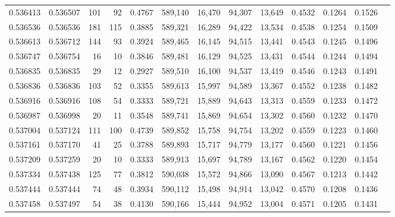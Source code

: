 \begin{tabular}{rrrrrrrrrrrrr}
0.536413 & 0.536507 &   101 &    92 &                                     0.4767 & 589,140 &  16,470 &  94,307 &  13,649 & 0.4532 & 0.1264 & 0.1526 \\
0.536536 & 0.536536 &   181 &   115 &                                     0.3885 & 589,321 &  16,289 &  94,422 &  13,534 & 0.4538 & 0.1254 & 0.1509 \\
0.536613 & 0.536712 &   144 &    93 &                                     0.3924 & 589,465 &  16,145 &  94,515 &  13,441 & 0.4543 & 0.1245 & 0.1496 \\
0.536747 & 0.536754 &    16 &    10 &                                     0.3846 & 589,481 &  16,129 &  94,525 &  13,431 & 0.4544 & 0.1244 & 0.1494 \\
0.536835 & 0.536835 &    29 &    12 &                                     0.2927 & 589,510 &  16,100 &  94,537 &  13,419 & 0.4546 & 0.1243 & 0.1491 \\
0.536836 & 0.536836 &   103 &    52 &                                     0.3355 & 589,613 &  15,997 &  94,589 &  13,367 & 0.4552 & 0.1238 & 0.1482 \\
0.536916 & 0.536916 &   108 &    54 &                                     0.3333 & 589,721 &  15,889 &  94,643 &  13,313 & 0.4559 & 0.1233 & 0.1472 \\
0.536987 & 0.536998 &    20 &    11 &                                     0.3548 & 589,741 &  15,869 &  94,654 &  13,302 & 0.4560 & 0.1232 & 0.1470 \\
0.537004 & 0.537124 &   111 &   100 &                                     0.4739 & 589,852 &  15,758 &  94,754 &  13,202 & 0.4559 & 0.1223 & 0.1460 \\
0.537161 & 0.537170 &    41 &    25 &                                     0.3788 & 589,893 &  15,717 &  94,779 &  13,177 & 0.4560 & 0.1221 & 0.1456 \\
0.537209 & 0.537259 &    20 &    10 &                                     0.3333 & 589,913 &  15,697 &  94,789 &  13,167 & 0.4562 & 0.1220 & 0.1454 \\
0.537334 & 0.537438 &   125 &    77 &                                     0.3812 & 590,038 &  15,572 &  94,866 &  13,090 & 0.4567 & 0.1213 & 0.1442 \\
0.537444 & 0.537444 &    74 &    48 &                                     0.3934 & 590,112 &  15,498 &  94,914 &  13,042 & 0.4570 & 0.1208 & 0.1436 \\
0.537458 & 0.537497 &    54 &    38 &                                     0.4130 & 590,166 &  15,444 &  94,952 &  13,004 & 0.4571 & 0.1205 & 0.1431 \\

\end{tabular}

